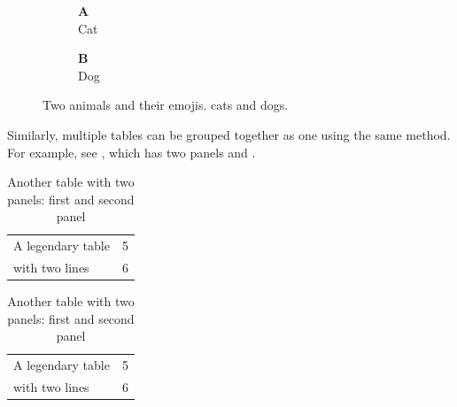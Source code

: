 \begin{figure}[t]
    \begin{subfigure}[b]{.5\linewidth}
        \centering
        \textbf{\sffamily A}\\[-0.5\onelineskip]
        \HUGE Cat \\
         
        \label{fig:subfigdemo-cat}
    \end{subfigure}%
    \begin{subfigure}[b]{.5\linewidth}
        \centering
        \textbf{\sffamily B}\\[-0.5\onelineskip]
        \HUGE Dog \\
         
        \label{fig:subfigdemo-dog}
    \end{subfigure}
    \caption{Two animals and their emojis.  cats
    and  dogs.}
    \label{fig:subfigure-demo}
\end{figure}

Similarly, multiple tables can be grouped together as one using the same method. For example, see , which has two panels  and .

\begin{table}[b]
    \centering
    \caption{Another table with two panels:  first and  second panel}
    \label{tab:subtable-demo}

    \begin{subtable}{0.5\linewidth}
        \centering
        \label{tab:subtab-a}
        \begin{tabular}{lc} \toprule
        A legendary table & 5 \\
        with two lines    & 6 \\ \bottomrule
        \end{tabular}
    \end{subtable}%
    \begin{subtable}{0.5\linewidth}
        \centering
        \label{tab:subtab-b}
        \begin{tabular}{lc} \toprule
        A legendary table & 5 \\
        with two lines    & 6 \\ \bottomrule
        \end{tabular}
    \end{subtable}
\end{table}


